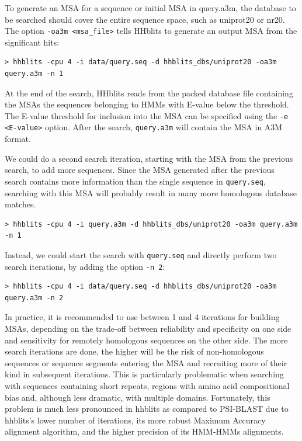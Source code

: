 \documentclass[11pt,a4paper]{article}
\begin{document}
To generate an MSA for a sequence or initial MSA in query.a3m, the database to be searched should cover the entire sequence space, such as uniprot20 or nr20. The option \verb`-oa3m <msa_file>` tells HHblits to generate an output MSA from the significant hits:
\begin{verbatim}
> hhblits -cpu 4 -i data/query.seq -d hhblits_dbs/uniprot20 -oa3m query.a3m -n 1
\end{verbatim}

At the end of the search, HHblits reads from the packed database file containing the MSAs the sequences belonging to HMMs with E-value below the threshold. The E-value threshold for inclusion into the MSA can be specified using the \verb`-e <E-value>` option. After the search, \verb`query.a3m` will contain the MSA in A3M format. 

We could do a second search iteration, starting with the MSA from the previous search, to add more sequences. Since the MSA generated after the previous search contains more information than the single sequence in \verb`query.seq`, searching with this MSA will probably result in many more homologous database matches.
\begin{verbatim}
> hhblits -cpu 4 -i query.a3m -d hhblits_dbs/uniprot20 -oa3m query.a3m -n 1
\end{verbatim}

Instead, we could start the search with \verb`query.seq` and directly perform two search iterations, by adding the option \verb`-n 2`:
\begin{verbatim}
> hhblits -cpu 4 -i data/query.seq -d hhblits_dbs/uniprot20 -oa3m query.a3m -n 2 
\end{verbatim}

In practice, it is recommended to use between 1 and 4 iterations for building MSAs, depending on the trade-off between reliability and specificity on one side and sensitivity for remotely homologous sequences on the other side. The more search iterations are done, the higher will be the risk of non-homologous sequences or sequence segments entering the MSA and recruiting more of their kind in subsequent iterations. This is particularly problematic when searching with sequences containing short repeats, regions with amino acid compositional bias and, although less dramatic,  with multiple domains. Fortunately, this problem is much less pronounced in hhblits as compared to PSI-BLAST due to hhblits's lower number of iterations, its more robust Maximum Accuracy alignment algorithm, and the higher precision of its HMM-HMMs alignments. 
\end{document}
